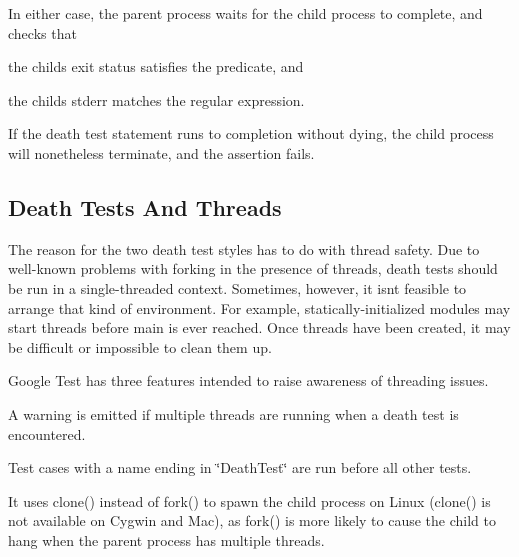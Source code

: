 In either case, the parent process waits for the child process to complete, and checks that


\begin{DoxyEnumerate}
\item the child\textquotesingle{}s exit status satisfies the predicate, and
\end{DoxyEnumerate}
\begin{DoxyEnumerate}
\item the child\textquotesingle{}s stderr matches the regular expression.
\end{DoxyEnumerate}

If the death test statement runs to completion without dying, the child process will nonetheless terminate, and the assertion fails.

\subsection*{Death Tests And Threads}

The reason for the two death test styles has to do with thread safety. Due to well-\/known problems with forking in the presence of threads, death tests should be run in a single-\/threaded context. Sometimes, however, it isn\textquotesingle{}t feasible to arrange that kind of environment. For example, statically-\/initialized modules may start threads before main is ever reached. Once threads have been created, it may be difficult or impossible to clean them up.

Google Test has three features intended to raise awareness of threading issues.


\begin{DoxyEnumerate}
\item A warning is emitted if multiple threads are running when a death test is encountered.
\end{DoxyEnumerate}
\begin{DoxyEnumerate}
\item Test cases with a name ending in \char`\"{}\+Death\+Test\char`\"{} are run before all other tests.
\end{DoxyEnumerate}
\begin{DoxyEnumerate}
\item It uses {\ttfamily clone()} instead of {\ttfamily fork()} to spawn the child process on Linux ({\ttfamily clone()} is not available on Cygwin and Mac), as {\ttfamily fork()} is more likely to cause the child to hang when the parent process has multiple threads.
\end{DoxyEnumerate}

